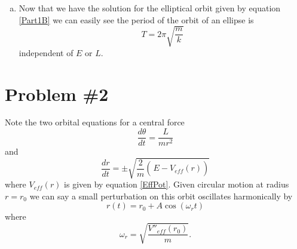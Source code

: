 \documentclass[11pt]{article}
\numberwithin{equation}{section}
\begin{document}
\begin{enumerate}[(a)]
\item
Now that we have the solution for the elliptical orbit given by equation \ref{Part1B} we can 
easily see the period of the orbit of an ellipse is
$$T = 2\pi\sqrt{\frac{m}{k}}$$
independent of $E$ or $L$.

\end{enumerate}

\pagebreak

\section{Problem \#2}
Note the two orbital equations for a central force 
\begin{equation}
\frac{d\theta}{dt} = \frac{L}{mr^2}
\label{OrbitEqnA}
\end{equation}
and
\begin{equation}
\frac{dr}{dt} = \pm\sqrt{\frac{2}{m}\left(\frac{}{}E-V_{eff}(r)\right)}
\label{OrbitEqnB}
\end{equation}
where $V_{eff}(r)$ is given by equation \ref{EffPot}. Given circular motion at radius 
$r=r_0$ we can say a small perturbation on this orbit oscillates harmonically by
\begin{equation}
r(t) = r_0+A\cos(\omega_rt)
\label{PertOrb}
\end{equation}
where
\begin{equation}
\omega_r = \sqrt{\frac{V''_{eff}(r_0)}{m}}.
\label{PertOrb}
\end{equation}
\end{document}
